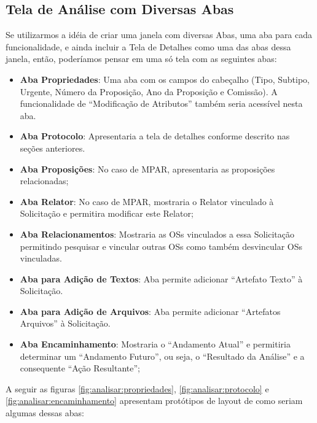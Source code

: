 \subsection{Tela de Análise com Diversas Abas}

Se utilizarmos a idéia de criar uma janela com diversas Abas, uma aba para cada funcionalidade, e ainda incluir a Tela de Detalhes como uma das abas dessa janela, então, poderíamos pensar em uma só tela com as seguintes abas:


\begin{itemize}
	\item \textbf{Aba Propriedades}: Uma aba com os campos do cabeçalho (Tipo, Subtipo, Urgente, Número da Proposição, Ano da Proposição e Comissão). A funcionalidade de ``Modificação de Atributos'' também seria acessível nesta aba.
	
	
	\item \textbf{Aba Protocolo}: Apresentaria a tela de detalhes conforme descrito nas seções anteriores.
	
	\item \textbf{Aba Proposições}: No caso de MPAR, apresentaria as proposições relacionadas;

	\item \textbf{Aba Relator}: No caso de MPAR, mostraria o Relator vinculado à Solicitação e permitira modificar este Relator; 

	\item \textbf{Aba Relacionamentos}: Mostraria as OSs vinculados a essa Solicitação permitindo pesquisar e vincular outras OSs como também desvincular OSs vinculadas. 

	\item \textbf{Aba para Adição de Textos}: Aba permite adicionar ``Artefato Texto'' à Solicitação.

	\item \textbf{Aba para Adição de Arquivos}: Aba permite adicionar ``Artefatos Arquivos'' à Solicitação.

	\item \textbf{Aba Encaminhamento}: Mostraria o ``Andamento Atual'' e permitiria determinar um ``Andamento Futuro'', ou seja, o ``Resultado da Análise'' e a consequente ``Ação Resultante'';
	
\end{itemize}

A seguir as figuras \ref{fig:analisar:propriedades}, \ref{fig:analisar:protocolo} e \ref{fig:analisar:encaminhamento}  apresentam protótipos de layout de como seriam algumas dessas abas:


